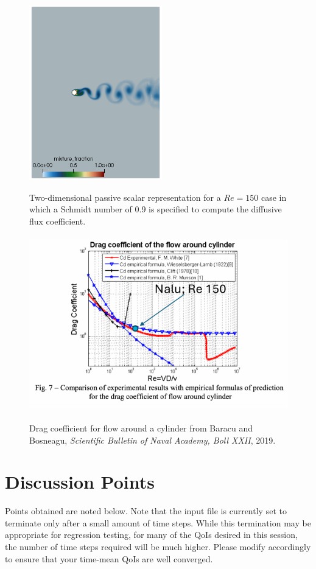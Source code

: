 \documentclass{article}
\begin{document}
\begin{figure}[!htbp]
  \centering
  {
   \includegraphics[height=3.0in]{images/vortexStreetR0.png}
  }
  \caption{Two-dimensional passive scalar representation for a $Re = 150$ case in which a Schmidt number of 0.9 is specified to
compute the diffusive flux coefficient.}
  \label{fig:passive_scalar}
\end{figure}

\begin{figure}[!htbp]
  \centering
  {
   \includegraphics[height=3.0in]{images/cylinder_drag-crop.pdf}
  }
  \caption{Drag coefficient for flow around a cylinder from Baracu and Bosneagu, {\em Scientific Bulletin of Naval Academy, Boll XXII}, 2019.}
  \label{fig:drag_re}
\end{figure}

\section{Discussion Points}
Points obtained are noted below. Note that the input file is currently set to terminate only after a small amount of time steps. While this
              termination may be appropriate for regression testing, for many of the QoIs desired in this
              session, the number of time steps required will be much higher. Please modify accordingly to ensure that your time-mean QoIs are well converged.
              
\end{document}
